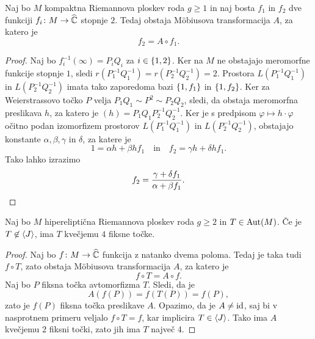 \begin{trditev}
Naj bo $M$ kompaktna Riemannova ploskev roda $g \geq 1$ in naj
bosta $f_1$ in $f_2$ dve funkciji $f_i \colon M \to \widehat{\mathbb{C}}$ stopnje
$2$. Tedaj obstaja Möbiusova transformacija $A$, za katero je
\[
f_2 = A \circ f_1.
\]
\end{trditev}

\begin{proof}
Naj bo $f_i^{-1}(\infty) = P_i Q_i$ za $i \in \left\{1,2\right\}$. Ker na
$M$ ne obstajajo meromorfne funkcije stopnje $1$, sledi
$r(P_1^{-1} Q_1^{-1}) = r(P_2^{-1} Q_2^{-1}) = 2$. Prostora
$L(P_1^{-1} Q_1^{-1})$ in $L(P_2^{-1} Q_2^{-1})$ imata tako
zaporedoma bazi $\left\{1, f_1\right\}$ in $\left\{1, f_2\right\}$. Ker za
Weierstrassovo točko $P$ velja $P_1 Q_1 \sim P^2 \sim P_2 Q_2$,
sledi, da obstaja meromorfna preslikava $h$, za katero je
$(h) = P_1 Q_1 P_2^{-1} Q_2^{-1}$. Ker je s predpisom
$\varphi \mapsto h \cdot \varphi$ očitno podan izomorfizem
prostorov $L(P_1^{-1} Q_1^{-1})$ in $L(P_2^{-1} Q_2^{-1})$,
obstajajo konstante $\alpha, \beta, \gamma$ in $\delta$, za katere
je
\[
1 = \alpha h + \beta hf_1
\quad \text{in} \quad
f_2 = \gamma h + \delta hf_1.
\]
Tako lahko izrazimo
\[
f_2 = \frac{\gamma + \delta f_1}{\alpha + \beta f_1}. \qedhere
\]
\end{proof}

\begin{trditev}
Naj bo $M$ hipereliptična Riemannova ploskev roda $g \geq 2$ in
$T \in \operatorname{Aut}(M)$. Če je $T \not \in \left\langle J\right\rangle$, ima $T$ kvečjemu $4$
fiksne točke.
\end{trditev}

\begin{proof}
Naj bo $f \colon M \to \widehat{\mathbb{C}}$ funkcija z natanko dvema poloma. Tedaj
je taka tudi $f \circ T$, zato obstaja Möbiusova transformacija
$A$, za katero je
\[
f \circ T = A \circ f.
\]
Naj bo $P$ fiksna točka avtomorfizma $T$. Sledi, da je
\[
A(f(P)) = f(T(P)) = f(P),
\]
zato je $f(P)$ fiksna točka preslikave $A$. Opazimo, da je
$A \ne \operatorname{id}$, saj bi v nasprotnem primeru veljalo $f \circ T = f$,
kar implicira $T \in \left\langle J\right\rangle$. Tako ima $A$ kvečjemu $2$ fiksni
točki, zato jih ima $T$ največ $4$.
\end{proof}
